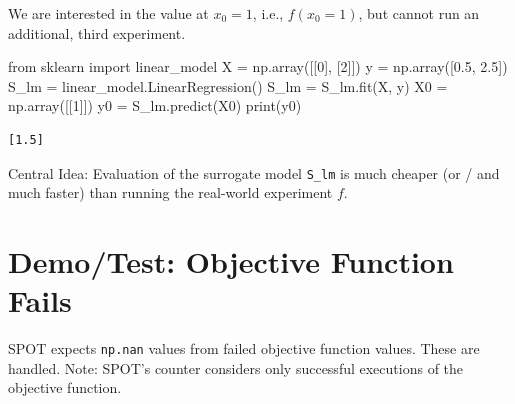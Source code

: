 \documentclass[
  letterpaper,
  DIV=11,
  numbers=noendperiod]{scrreprt}
\newenvironment{Shaded}{\begin{snugshade}}{\end{snugshade}}
\newcommand{\BuiltInTok}[1]{\textcolor[rgb]{0.00,0.23,0.31}{#1}}
\newcommand{\DecValTok}[1]{\textcolor[rgb]{0.68,0.00,0.00}{#1}}
\newcommand{\FloatTok}[1]{\textcolor[rgb]{0.68,0.00,0.00}{#1}}
\newcommand{\ImportTok}[1]{\textcolor[rgb]{0.00,0.46,0.62}{#1}}
\newcommand{\NormalTok}[1]{\textcolor[rgb]{0.00,0.23,0.31}{#1}}
\newcommand{\OperatorTok}[1]{\textcolor[rgb]{0.37,0.37,0.37}{#1}}
\begin{document}
We are interested in the value at \(x_0 = 1\), i.e., \(f(x_0 = 1)\), but
cannot run an additional, third experiment.

\begin{Shaded}
\begin{Highlighting}[]
\ImportTok{from}\NormalTok{ sklearn }\ImportTok{import}\NormalTok{ linear\_model}
\NormalTok{X }\OperatorTok{=}\NormalTok{ np.array([[}\DecValTok{0}\NormalTok{], [}\DecValTok{2}\NormalTok{]])}
\NormalTok{y }\OperatorTok{=}\NormalTok{ np.array([}\FloatTok{0.5}\NormalTok{, }\FloatTok{2.5}\NormalTok{])}
\NormalTok{S\_lm }\OperatorTok{=}\NormalTok{ linear\_model.LinearRegression()}
\NormalTok{S\_lm }\OperatorTok{=}\NormalTok{ S\_lm.fit(X, y)}
\NormalTok{X0 }\OperatorTok{=}\NormalTok{ np.array([[}\DecValTok{1}\NormalTok{]])}
\NormalTok{y0 }\OperatorTok{=}\NormalTok{ S\_lm.predict(X0)}
\BuiltInTok{print}\NormalTok{(y0)}
\end{Highlighting}
\end{Shaded}

\begin{verbatim}
[1.5]
\end{verbatim}

Central Idea: Evaluation of the surrogate model \texttt{S\_lm} is much
cheaper (or / and much faster) than running the real-world experiment
\(f\).

\hypertarget{demotest-objective-function-fails}{%
\section{Demo/Test: Objective Function
Fails}\label{demotest-objective-function-fails}}

SPOT expects \texttt{np.nan} values from failed objective function
values. These are handled. Note: SPOT's counter considers only
successful executions of the objective function.
\end{document}
